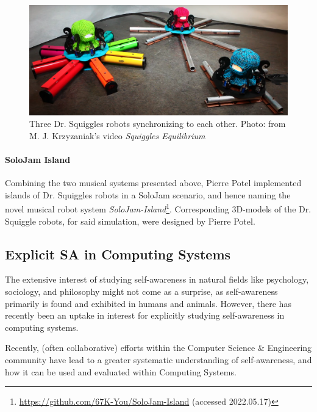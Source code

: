 			\begin{figure}[!htp]
			\centering
				\includegraphics[width=\columnwidth]{Assets/DocSegments/Chapters/Background/Figures/Photos/dr_squiggles_synchronizing.png}
				\caption[Three Dr. Squiggles robots synchronizing to each other.]{Three Dr. Squiggles robots synchronizing to each other. Photo: from M. J. Krzyzaniak's video \textit{Squiggles Equilibrium}\protect\footnotemark}
				\label{fig:background_dr_squiggles_synchronizing}
			\end{figure}
			
			
			\paragraph{SoloJam Island \nl}
			\label{solojam_island}
			
			Combining the two musical systems presented above, Pierre Potel implemented islands of Dr. Squiggles robots in a SoloJam scenario, and hence naming the novel musical robot system \textit{SoloJam-Island}\footnote{\url{https://github.com/67K-You/SoloJam-Island} (accessed 2022.05.17)}. Corresponding 3D-models of the Dr. Squiggle robots, for said simulation, were designed by Pierre Potel.
			

	\subsection{Explicit SA in Computing Systems}
	The extensive interest of studying self-awareness in natural fields like psychology, sociology, and philosophy might not come as a surprise, as self-awareness primarily is found and exhibited in humans and animals. However, there has recently been an uptake in interest for explicitly studying self-awareness in computing systems.

	Recently, (often collaborative) efforts within the Computer Science \& Engineering community \cite{sacs16_ch2, sacs17_ch1, sacs17_ch3} have lead to a greater systematic understanding of self-awareness, and how it can be used and evaluated within Computing Systems.

